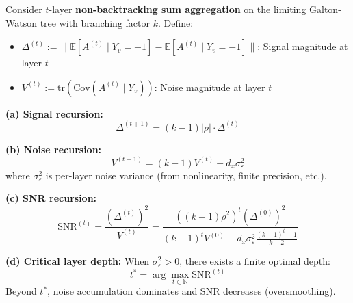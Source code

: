 \begin{theorem}
\label{thm:multilayer_with_noise}
Consider $t$-layer \textbf{non-backtracking sum aggregation} on the limiting Galton-Watson tree with branching factor $k$. Define:
\begin{itemize}
    \item $\Delta^{(t)} := \|\mathbb{E}[A^{(t)} \mid Y_v = +1] - \mathbb{E}[A^{(t)} \mid Y_v = -1]\|$: Signal magnitude at layer $t$
    \item $V^{(t)} := \mathrm{tr}(\mathrm{Cov}(A^{(t)} \mid Y_v))$: Noise magnitude at layer $t$
\end{itemize}

\textbf{(a) Signal recursion:}
\begin{equation}
    \Delta^{(t+1)} = (k-1) |\rho| \cdot \Delta^{(t)}
\end{equation}

\textbf{(b) Noise recursion:}
\begin{equation}
    V^{(t+1)} = (k-1) V^{(t)} + d_x \sigma_{\varepsilon}^2
\end{equation}
where $\sigma_{\varepsilon}^2$ is per-layer noise variance (from nonlinearity, finite precision, etc.).

\textbf{(c) SNR recursion:}
\begin{equation}
    \mathrm{SNR}^{(t)} = \frac{(\Delta^{(t)})^2}{V^{(t)}} = \frac{((k-1)\rho^2)^t (\Delta^{(0)})^2}{(k-1)^t V^{(0)} + d_x \sigma_{\varepsilon}^2 \frac{(k-1)^t - 1}{k-2}}
\end{equation}

\textbf{(d) Critical layer depth:}
When $\sigma_{\varepsilon}^2 > 0$, there exists a finite optimal depth:
\begin{equation}
    t^* = \arg\max_{t \in \mathbb{N}} \mathrm{SNR}^{(t)}
\end{equation}
Beyond $t^*$, noise accumulation dominates and SNR decreases (oversmoothing).
\end{theorem}

